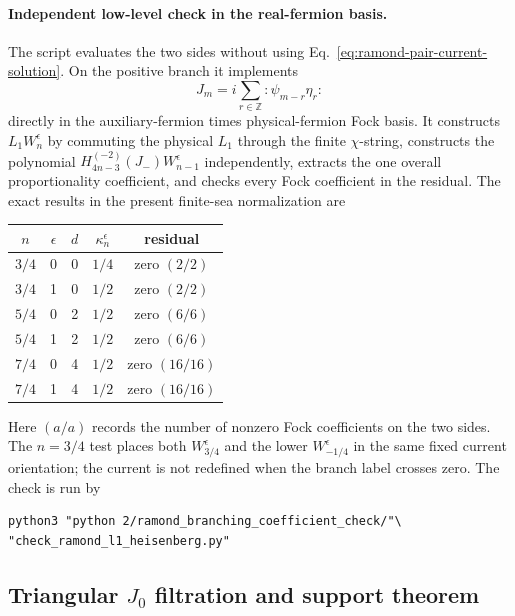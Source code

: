 \documentclass[11pt]{article}
\begin{document}
\paragraph{Independent low-level check in the real-fermion basis.}
The script
 evaluates the two sides without
using Eq.~\eqref{eq:ramond-pair-current-solution}.  On the positive branch it
implements
\begin{equation}
 J_m=i\sum_{r\in\mathbb Z}:\!\psi_{m-r}\eta_r\!:
 \label{eq:ramond-current-real-fermions}
\end{equation}
directly in the auxiliary-fermion times physical-fermion Fock basis.  It
constructs \(L_1W_n^\epsilon\) by commuting the physical \(L_1\) through the
finite \(\chi\)-string, constructs the polynomial
\(H_{4n-3}^{(-2)}(J_-)W_{n-1}^\epsilon\) independently, extracts the one
overall proportionality coefficient, and checks every Fock coefficient in
the residual.  The exact results in the present finite-sea normalization
are
\begin{center}
\begin{tabular}{c|c|c|c|c}
\(n\)&\(\epsilon\)&\(d\)&\(\kappa_n^\epsilon\)&residual\\
\hline
\(3/4\)&0&0&\(1/4\)&zero \((2/2)\)\\
\(3/4\)&1&0&\(1/2\)&zero \((2/2)\)\\
\(5/4\)&0&2&\(1/2\)&zero \((6/6)\)\\
\(5/4\)&1&2&\(1/2\)&zero \((6/6)\)\\
\(7/4\)&0&4&\(1/2\)&zero \((16/16)\)\\
\(7/4\)&1&4&\(1/2\)&zero \((16/16)\)
\end{tabular}
\end{center}
Here \((a/a)\) records the number of nonzero Fock coefficients on the two
sides.  The \(n=3/4\) test places both \(W_{3/4}^\epsilon\) and the lower
\(W_{-1/4}^\epsilon\) in the same fixed current orientation; the current is
not redefined when the branch label crosses zero.  The check is run by
\begin{verbatim}
python3 "python 2/ramond_branching_coefficient_check/"\
"check_ramond_l1_heisenberg.py"
\end{verbatim}

\subsection{Triangular \texorpdfstring{\(J_0\)}{J0} filtration and support
theorem}
\end{document}

